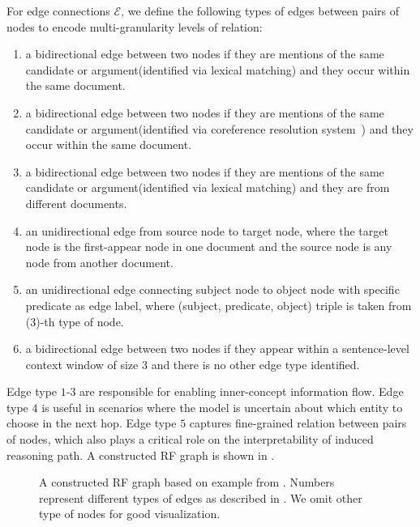 For edge connections $\mathcal{E}$, we define the following types of edges between pairs of nodes to encode multi-granularity levels of relation:
\begin{enumerate}
  \item a bidirectional edge between two nodes if they are mentions of the same candidate or argument(identified via lexical matching) and they occur within the same document.
  \item a bidirectional edge between two nodes if they are mentions of the same candidate or argument(identified via coreference resolution system~\cite{Gardner2017AllenNLP}) and they occur within the same document.
  \item a bidirectional edge between two nodes if they are mentions of the same candidate or argument(identified via lexical matching) and they are from different documents.
  \item an unidirectional edge from source node to target node, where the target node is the first-appear node in one document and the source node is any node from another document.
  \item an unidirectional edge connecting subject node to object node with specific predicate as edge label, where (subject, predicate, object) triple is taken from (3)-th type of node.
  \item a bidirectional edge between two nodes if they appear within a sentence-level context window of size $3$ and there is no other edge type identified.
\end{enumerate}

Edge type $1$-$3$ are responsible for enabling inner-concept information flow. Edge type $4$ is useful in scenarios where the model is uncertain about which entity to choose in the next hop. Edge type $5$ captures fine-grained relation between pairs of nodes, which also plays a critical role on the interpretability of induced reasoning path. A constructed RF graph is shown in .

\begin{figure}[th]
	\centering
	\caption{A constructed RF graph based on example from . Numbers represent different types of edges as described in . We omit other type of nodes for good visualization.} \label{fig:rf}
\end{figure}


